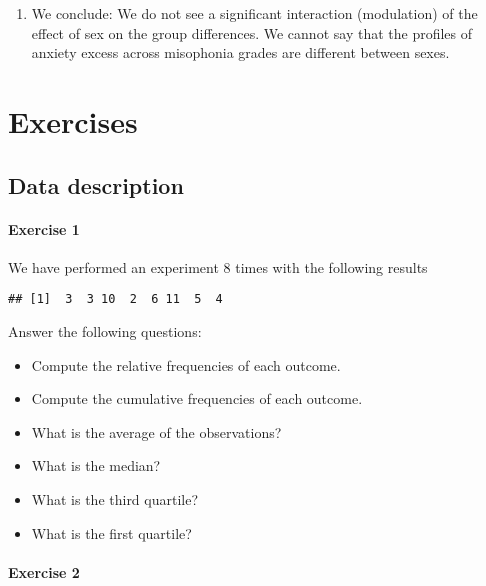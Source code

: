 \documentclass[
]{book}
\providecommand{\tightlist}{%
  \setlength{\itemsep}{0pt}\setlength{\parskip}{0pt}}
\begin{document}
\begin{enumerate}
\def\labelenumi{\alph{enumi}.}
\setcounter{enumi}{2}
\tightlist
\item
  We conclude: We do not see a significant interaction (modulation) of the effect of sex on the group differences. We cannot say that the profiles of anxiety excess across misophonia grades are different between sexes.
\end{enumerate}

\hypertarget{exercises}{%
\chapter{Exercises}\label{exercises}}

\hypertarget{data-description-1}{%
\section{Data description}\label{data-description-1}}

\hypertarget{exercise-1}{%
\subsubsection{Exercise 1}\label{exercise-1}}

We have performed an experiment 8 times with the following results

\begin{verbatim}
## [1]  3  3 10  2  6 11  5  4
\end{verbatim}

Answer the following questions:

\begin{itemize}
\tightlist
\item
  Compute the relative frequencies of each outcome.
\item
  Compute the cumulative frequencies of each outcome.
\item
  What is the average of the observations?
\item
  What is the median?
\item
  What is the third quartile?
\item
  What is the first quartile?
\end{itemize}

\hypertarget{exercise-2}{%
\subsubsection{Exercise 2}\label{exercise-2}}
\end{document}
